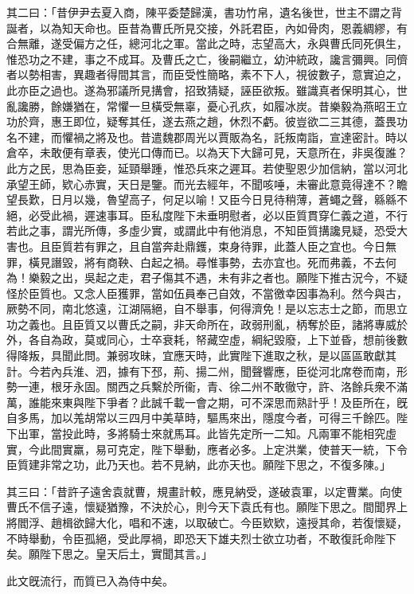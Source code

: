 \begin{pinyinscope}
其二曰：「昔伊尹去夏入商，陳平委楚歸漢，書功竹帛，遺名後世，世主不謂之背誕者，以為知天命也。臣昔為曹氏所見交接，外託君臣，內如骨肉，恩義綢繆，有合無離，遂受偏方之任，總河北之軍。當此之時，志望高大，永與曹氏同死俱生，惟恐功之不建，事之不成耳。及曹氏之亡，後嗣繼立，幼沖統政，讒言彌興。同儕者以勢相害，異趣者得間其言，而臣受性簡略，素不下人，視彼數子，意實迫之，此亦臣之過也。遂為邪議所見搆會，招致猜疑，誣臣欲叛。雖識真者保明其心，世亂讒勝，餘嫌猶在，常懼一旦橫受無辜，憂心孔疚，如履冰炭。昔樂毅為燕昭王立功於齊，惠王即位，疑奪其任，遂去燕之趙，休烈不虧。彼豈欲二三其德，蓋畏功名不建，而懼禍之將及也。昔遣魏郡周光以賈販為名，託叛南詣，宣達密計。時以倉卒，未敢便有章表，使光口傳而已。以為天下大歸可見，天意所在，非吳復誰？此方之民，思為臣妾，延頸舉踵，惟恐兵來之遲耳。若使聖恩少加信納，當以河北承望王師，欵心赤實，天日是鑒。而光去經年，不聞咳唾，未審此意竟得達不？瞻望長歎，日月以幾，魯望高子，何足以喻！又臣今日見待稍薄，蒼蠅之聲，緜緜不絕，必受此禍，遲速事耳。臣私度陛下未垂明慰者，必以臣質貫穿仁義之道，不行若此之事，謂光所傳，多虛少實，或謂此中有他消息，不知臣質搆讒見疑，恐受大害也。且臣質若有罪之，且自當奔赴鼎鑊，束身待罪，此蓋人臣之宜也。今日無罪，橫見譖毀，將有商鞅、白起之禍。尋惟事勢，去亦宜也。死而弗義，不去何為！樂毅之出，吳起之走，君子傷其不遇，未有非之者也。願陛下推古況今，不疑怪於臣質也。又念人臣獲罪，當如伍員奉己自效，不當徼幸因事為利。然今與古，厥勢不同，南北悠遠，江湖隔絕，自不舉事，何得濟免！是以忘志士之節，而思立功之義也。且臣質又以曹氏之嗣，非天命所在，政弱刑亂，柄奪於臣，諸將專威於外，各自為政，莫或同心，士卒衰耗，帑藏空虛，綱紀毀廢，上下並昏，想前後數得降叛，具聞此問。兼弱攻昧，宜應天時，此實陛下進取之秋，是以區區敢獻其計。今若內兵淮、泗，據有下邳，荊、揚二州，聞聲響應，臣從河北席卷而南，形勢一連，根牙永固。關西之兵繫於所衞，青、徐二州不敢徹守，許、洛餘兵衆不滿萬，誰能來東與陛下爭者？此誠千載一會之期，可不深思而熟計乎！及臣所在，旣自多馬，加以羗胡常以三四月中美草時，驅馬來出，隱度今者，可得三千餘匹。陛下出軍，當投此時，多將騎士來就馬耳。此皆先定所一二知。凡兩軍不能相究虛實，今此間實羸，易可克定，陛下舉動，應者必多。上定洪業，使普天一統，下令臣質建非常之功，此乃天也。若不見納，此亦天也。願陛下思之，不復多陳。」

其三曰：「昔許子遠舍袁就曹，規畫計較，應見納受，遂破袁軍，以定曹業。向使曹氏不信子遠，懷疑猶豫，不決於心，則今天下袁氏有也。願陛下思之。間聞界上將閻浮、趙楫欲歸大化，唱和不速，以取破亡。今臣欵欵，遠授其命，若復懷疑，不時舉動，令臣孤絕，受此厚禍，即恐天下雄夫烈士欲立功者，不敢復託命陛下矣。願陛下思之。皇天后土，實聞其言。」

此文旣流行，而質已入為侍中矣。


\end{pinyinscope}
